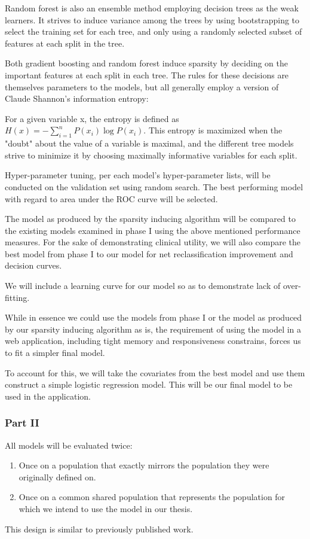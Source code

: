 \documentclass[a4paper,12pt]{article}
\begin{document}
		Random forest is also an ensemble method employing decision trees as the weak learners. It strives to induce variance among the trees by using bootstrapping to select the training set for each tree, and only using a randomly selected subset of features at each split in the tree.
		
		Both gradient boosting and random forest induce sparsity by deciding on the important features at each split in each tree. The rules for these decisions are themselves parameters to the models, but all generally employ a version of Claude Shannon's information entropy:
		
		For a given variable x, the entropy is defined as $ H(x) = -\sum_{i=1}^{n} P(x_i) \log P(x_i)$. This entropy is maximized when the "doubt" about the value of a variable is maximal, and the different tree models strive to minimize it by choosing maximally informative variables for each split.
		
		Hyper-parameter tuning, per each model's hyper-parameter lists, will be conducted on the validation set using random search\cite{Bergstra2012}. The best performing model with regard to area under the ROC curve will be selected.
		
		The model as produced by the sparsity inducing algorithm will be compared to the existing models examined in phase I using the above mentioned performance measures. For the sake of demonstrating clinical utility, we will also compare the best model from phase I to our model for net reclassification improvement\cite{Pencina2008} and decision curves\cite{Vickers2016}.
		
		We will include a learning curve for our model so as to demonstrate lack of over-fitting.
		
		While in essence we could use the models from phase I or the model as produced by our sparsity inducing algorithm as is, the requirement of using the model in a web application, including tight memory and responsiveness constrains, forces us to fit a simpler final model.
		
		To account for this, we will take the covariates from the best model and use them construct a simple logistic regression model. This will be our final model to be used in the application.
		
		\subsubsection{Part II}
		
		All models will be evaluated twice:
		\begin{enumerate}
			\item Once on a population that exactly mirrors the population they were originally defined on.
			\item Once on a common shared population that represents the population for which we intend to use the model in our thesis.
		\end{enumerate}
		This design is similar to previously published work\cite{Dagan2017}.
		
\end{document}
